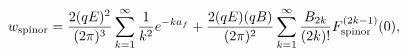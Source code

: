 \begin{equation}
w_{\rm spinor} = \frac{2(qE)^2}{(2 \pi)^3} \sum_{k = 1}^{\infty}
\frac{1}{k^2} e^{- k a_f} + 
\frac{2(qE)(qB)}{(2 \pi)^2} \sum_{k = 1}^{\infty} 
\frac{B_{2k}}{(2k)!} F_{\rm spinor}^{(2k-1)} (0), \label{f-p2} 
\end{equation} 
